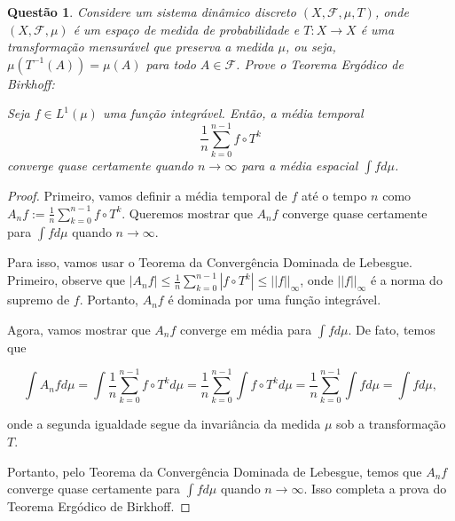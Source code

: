 \documentclass{article}
\newtheorem{question}{Questão}
\begin{document}
\begin{question}
Considere um sistema dinâmico discreto $(X, \mathcal{F}, \mu, T)$, onde $(X, \mathcal{F}, \mu)$ é um espaço de medida de probabilidade e $T: X \rightarrow X$ é uma transformação mensurável que preserva a medida $\mu$, ou seja, $\mu(T^{-1}(A)) = \mu(A)$ para todo $A \in \mathcal{F}$. Prove o Teorema Ergódico de Birkhoff:

Seja $f \in L^1(\mu)$ uma função integrável. Então, a média temporal
\[\frac{1}{n}\sum_{k=0}^{n-1} f \circ T^k\]
converge quase certamente quando $n \rightarrow \infty$ para a média espacial $\int f d\mu$.
\end{question}

\begin{proof}
Primeiro, vamos definir a média temporal de $f$ até o tempo $n$ como $A_n f := \frac{1}{n}\sum_{k=0}^{n-1} f \circ T^k$. Queremos mostrar que $A_n f$ converge quase certamente para $\int f d\mu$ quando $n \rightarrow \infty$.

Para isso, vamos usar o Teorema da Convergência Dominada de Lebesgue. Primeiro, observe que $|A_n f| \leq \frac{1}{n}\sum_{k=0}^{n-1} |f \circ T^k| \leq ||f||_{\infty}$, onde $||f||_{\infty}$ é a norma do supremo de $f$. Portanto, $A_n f$ é dominada por uma função integrável.

Agora, vamos mostrar que $A_n f$ converge em média para $\int f d\mu$. De fato, temos que

\[\int A_n f d\mu = \int \frac{1}{n}\sum_{k=0}^{n-1} f \circ T^k d\mu = \frac{1}{n}\sum_{k=0}^{n-1} \int f \circ T^k d\mu = \frac{1}{n}\sum_{k=0}^{n-1} \int f d\mu = \int f d\mu,\]

onde a segunda igualdade segue da invariância da medida $\mu$ sob a transformação $T$.

Portanto, pelo Teorema da Convergência Dominada de Lebesgue, temos que $A_n f$ converge quase certamente para $\int f d\mu$ quando $n \rightarrow \infty$. Isso completa a prova do Teorema Ergódico de Birkhoff.
\end{proof}
\end{document}
